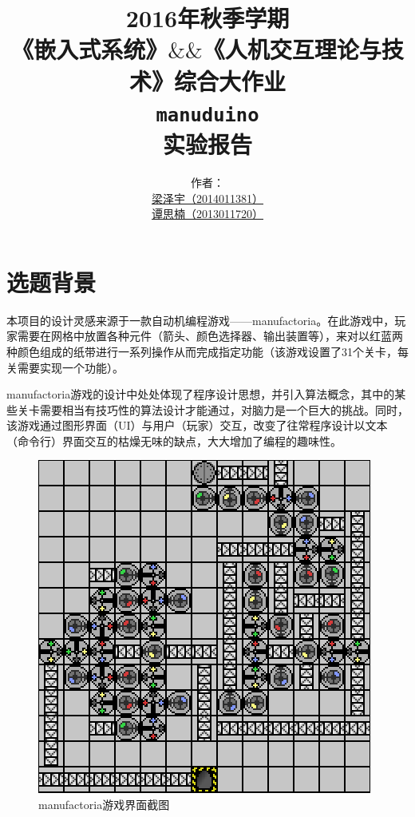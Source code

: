 \documentclass[UTF8]{ctexart}
\begin{document}
\title{\Large 2016年秋季学期\\ \large 《嵌入式系统》$\&\&$《人机交互理论与技术》综合大作业 \\ \LARGE \texttt{manuduino} \\ 实验报告 \vspace*{2ex}}
\author{作者：\\ \uline{梁泽宇（2014011381）} \\ \uline{谭思楠（2013011720）}}
\date{}
\maketitle \thispagestyle{plain} \newpage \pagestyle{plain}

\section{选题背景}
本项目的设计灵感来源于一款自动机编程游戏——manufactoria。在此游戏中，玩家需要在网格中放置各种元件（箭头、颜色选择器、输出装置等），来对以红蓝两种颜色组成的纸带进行一系列操作从而完成指定功能（该游戏设置了31个关卡，每关需要实现一个功能）。\par
manufactoria游戏的设计中处处体现了程序设计思想，并引入算法概念，其中的某些关卡需要相当有技巧性的算法设计才能通过，对脑力是一个巨大的挑战。同时，该游戏通过图形界面（UI）与用户（玩家）交互，改变了往常程序设计以文本（命令行）界面交互的枯燥无味的缺点，大大增加了编程的趣味性。\par
\vspace*{2ex}
\begin{figure}[htb]
	\centering \includegraphics[scale=0.75]{0.png} \par
	\caption{manufactoria游戏界面截图}
\end{figure}
\end{document}
